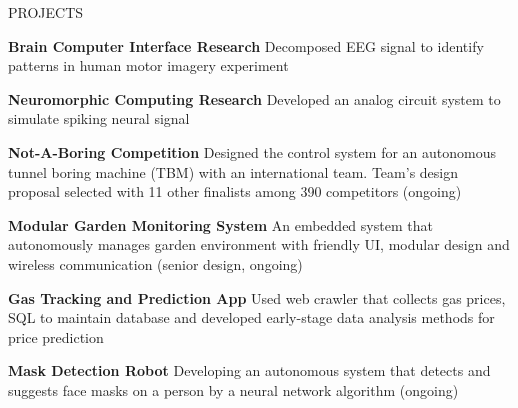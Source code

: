 \documentclass{resume} %
\begin{document}
	
	\begin{rSection}{PROJECTS}
		\vspace{-1em}
		\item \textbf{Brain Computer Interface Research} {Decomposed EEG signal to identify patterns in human motor imagery experiment}
		
		\item \textbf{Neuromorphic Computing Research} {Developed an analog circuit system to simulate spiking neural signal}
		
		\item \textbf{Not-A-Boring Competition} {Designed the control system for an autonomous tunnel boring machine (TBM) with an international team. Team's design proposal selected with 11 other finalists among 390 competitors (ongoing)}
		
		\item \textbf{Modular Garden Monitoring System} {An embedded system that autonomously manages garden environment with friendly UI, modular design and wireless communication (senior design, ongoing)}
		
		\item \textbf{Gas Tracking and Prediction App} {Used web crawler that collects gas prices, SQL to maintain database and developed early-stage data analysis methods for price prediction}
		
		\item \textbf{Mask Detection Robot} {Developing an autonomous system that detects and suggests face masks on a person by a neural network algorithm (ongoing)}
		
		
	\end{rSection} 
	
%		
%		
%	
%		
%		
	
	
\end{document}
